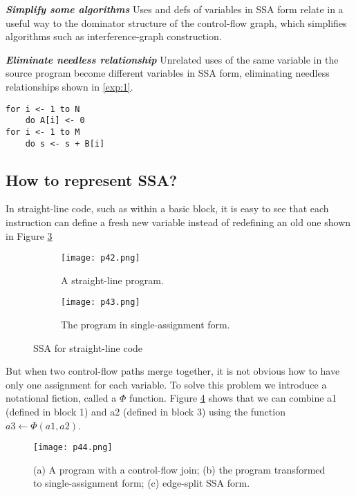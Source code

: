 \textbf{ \large \textit{Simplify some algorithms}} Uses and defs of variables in SSA form relate in a useful way to the dominator structure of the control-flow graph, which simplifies algorithms such as interference-graph construction.


\textbf{ \large \textit{Eliminate needless relationship}} Unrelated uses of the same variable in the source program become different variables in SSA form, eliminating needless relationships shown in \ref{exp:1}.

\begin{lstlisting}[label={exp:1},caption={}]
for i <- 1 to N 
	do A[i] <- 0
for i <- 1 to M 
	do s <- s + B[i]
\end{lstlisting}


\subsection{How to represent SSA?}

In straight-line code, such as within a basic block, it is easy to see that each instruction can define a fresh new 
variable instead of redefining an old one shown in Figure \ref{fig:p42-43}


\begin{figure}[htb]
	\centering
	\begin{subfigure}{0.2\textwidth}
		\centering
		\texttt{[image: p42.png]}
		\caption{A straight-line program.}
		\label{fig:p42}
	\end{subfigure}
	\begin{subfigure}{0.25\textwidth}
		\centering
		\texttt{[image: p43.png]}
		\caption{The program in single-assignment form.}
		\label{fig:p43}
	\end{subfigure}
	\caption{SSA for straight-line code}
	\label{fig:p42-43}
\end{figure}


But when two control-flow paths merge together, it is not obvious how to have only one assignment for each variable. To solve this problem we introduce a notational fiction, called a $\Phi$ function. Figure \ref{fig:p44} shows that we can combine a1 (defined in block 1) and a2 (defined in block 3) using the function $a3 \leftarrow \Phi(a1, a2)$.


\begin{figure}[H]
	\centering
	\texttt{[image: p44.png]}
	\caption{(a) A program with a control-flow join; (b) the program transformed to single-assignment form; (c) edge-split SSA form.}
	\label{fig:p44}
\end{figure}


